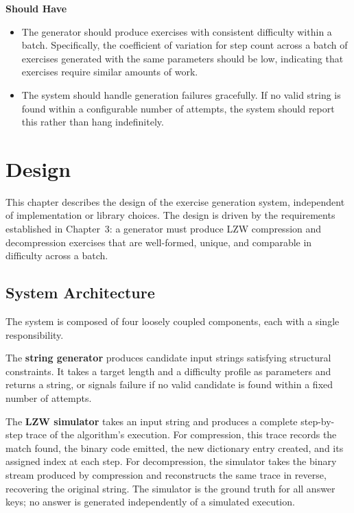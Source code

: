 \documentclass{l4proj}
\begin{document}
\textbf{Should Have}

\begin{itemize}
    \item The generator should produce exercises with consistent difficulty within a batch. Specifically, the coefficient of variation for step count across a batch of exercises generated with the same parameters should be low, indicating that exercises require similar amounts of work.

    \item The system should handle generation failures gracefully. If no valid string is found within a configurable number of attempts, the system should report this rather than hang indefinitely.
\end{itemize}


\chapter{Design}

This chapter describes the design of the exercise generation system, independent of implementation or library choices. The design is driven by the requirements established in Chapter~3: a generator must produce LZW compression and decompression exercises that are well-formed, unique, and comparable in difficulty across a batch.

\section{System Architecture}

The system is composed of four loosely coupled components, each with a single responsibility.

The \textbf{string generator} produces candidate input strings satisfying structural constraints. It takes a target length and a difficulty profile as parameters and returns a string, or signals failure if no valid candidate is found within a fixed number of attempts.

The \textbf{LZW simulator} takes an input string and produces a complete step-by-step trace of the algorithm's execution. For compression, this trace records the match found, the binary code emitted, the new dictionary entry created, and its assigned index at each step. For decompression, the simulator takes the binary stream produced by compression and reconstructs the same trace in reverse, recovering the original string. The simulator is the ground truth for all answer keys; no answer is generated independently of a simulated execution.
\end{document}
